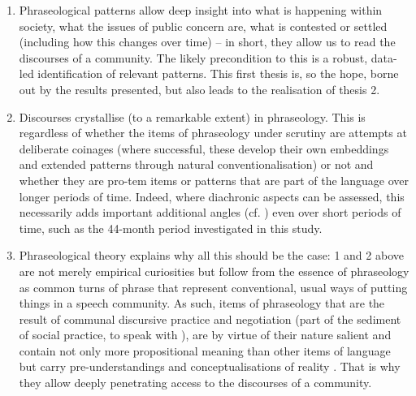 \documentclass[output=paper]{langscibook}
\begin{document}
\begin{enumerate}
\item Phraseological patterns allow deep insight into what is happening within society, what the issues of public concern are, what is contested or settled (including how this changes over time) -- in short, they allow us to read the discourses of a community. The likely precondition to this is a robust, data-led identification of relevant patterns. This first thesis is, so the hope, borne out by the results presented, but also leads to the realisation of thesis 2.
\item Discourses crystallise (to a remarkable extent) in phraseology. This is regardless of whether the items of phraseology under scrutiny are attempts at deliberate coinages (where successful, these develop their own embeddings and extended patterns through natural conventionalisation) or not and whether they are pro-tem items or patterns that are part of the language over longer periods of time. Indeed, where diachronic aspects can be assessed, this necessarily adds important additional angles (cf. \citealt{Mair2019}) even over short periods of time, such as the 44-month period investigated in this study.
\item Phraseological theory explains why all this should be the case: 1 and 2 above are not merely empirical curiosities but follow from the essence of phraseology as common turns of phrase that represent conventional, usual ways of putting things in a speech community. As such, items of phraseology that are the result of communal discursive practice and negotiation (part of the sediment of social practice, to speak with \citealt{Bourdieu1977}), are by virtue of their nature salient and contain not only more propositional meaning than other items of language but carry pre-understandings and conceptualisations of reality \citep{Feilke1994,Lakoff2010}. That is why they allow deeply penetrating access to the discourses of a community.
\end{enumerate}


{\sloppy\printbibliography[heading=subbibliography,notkeyword=this]}
\end{document}
